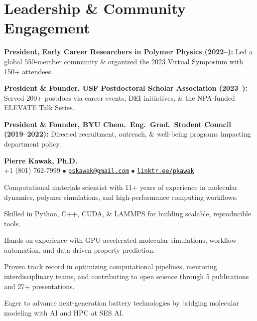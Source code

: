 \section*{Leadership \& Community Engagement}
\begin{tabitemize}
  \item \textbf{President, Early Career Researchers in Polymer Physics (2022–):} Led a global 550-member community \& organized the 2023 Virtual Symposium with 150+ attendees.
  \item \textbf{President \& Founder, USF Postdoctoral Scholar Association (2023–):} Served 200+ postdocs via career events, DEI initiatives, \& the NPA-funded ELEVATE Talk Series.
  \item \textbf{President \& Founder, BYU Chem.~Eng.~Grad.~Student Council (2019–2022):} Directed recruitment, outreach, \& well-being programs impacting department policy.
\end{tabitemize}
\vspace{1.0\baselineskip}

\begin{center}
  {\LARGE \textbf{Pierre Kawak, Ph.D.} }\\[1ex]
  +1 (801) 762-7999 $\bullet$ \href{mailto:pskawak@gmail.com}{\tt pskawak@gmail.com} $\bullet$ \href{https://linktr.ee/pkawak}{\tt linktr.ee/pkawak}\\
\end{center}
\begin{tabitemize}
  \item Computational materials scientist with 11+ years of experience in molecular dynamics, polymer simulations, and high-performance computing workflows.
  \item Skilled in Python, C++, CUDA, \& LAMMPS for building scalable, reproducible tools.
  \item Hands-on experience with GPU-accelerated molecular simulations, workflow automation, and data-driven property prediction.
  \item Proven track record in optimizing computational pipelines, mentoring interdisciplinary teams, and contributing to open science through 5 publications and 27+ presentations.
  \item Eager to advance next-generation battery technologies by bridging molecular modeling with AI and HPC at SES AI.
\end{tabitemize}
